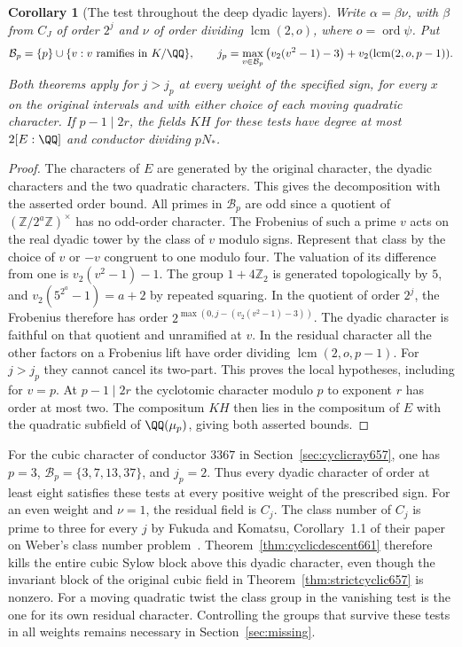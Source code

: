 \documentclass[a4paper,11pt]{article}
\newtheorem{corollary}[proposition]{Corollary}
\theoremstyle{definition}
\theoremstyle{remark}
\newcommand{\ZZ}{\mathbb Z}\newcommand{\ord}{\operatorname{ord}}
\numberwithin{equation}{section}
\begin{document}
\begin{corollary}[The test throughout the deep dyadic layers]
\leavevmode\label{cor:dyadiccyclic661}
Write \(\alpha=\beta\nu\), with \(\beta\) from \(C_J\) of order
\(2^j\) and \(\nu\) of order dividing \(\operatorname{lcm}(2,o)\),
where \(o=\operatorname{ord}\psi\). Put
\[
 \mathcal B_p=\{p\}\cup\{v:v\text{ ramifies in }K/\QQ\},
 \qquad
 j_p=\max_{v\in\mathcal B_p}\big(v_2(v^2-1)-3\big)
                          +v_2(\operatorname{lcm}(2,o,p-1)).
\]
Both theorems apply for \(j>j_p\) at every weight of the
specified sign, for every \(x\) on the original intervals and
with either choice of each moving quadratic character.
If \(p-1\mid 2r\), the fields \(KH\) for these tests have degree
at most \(2[E:\QQ]\) and conductor dividing \(pN_*\).
\end{corollary}
\begin{proof}
The characters of \(E\) are generated by the original character,
the dyadic characters and the two quadratic characters. This
gives the decomposition with the asserted order bound. All
primes in \(\mathcal B_p\) are odd since a quotient of
\((\ZZ/2^a\ZZ)^\times\) has no odd-order character.
The Frobenius of such a prime \(v\) acts on the real dyadic
tower by the class of \(v\) modulo signs. Represent that class
by the choice of \(v\) or \(-v\) congruent to one modulo four.
The valuation of its difference from one is \(v_2(v^2-1)-1\).
The group \(1+4\ZZ_2\) is generated topologically by \(5\),
and \(v_2(5^{2^a}-1)=a+2\) by repeated squaring. In the
quotient of order \(2^j\), the Frobenius therefore has order
\(2^{\max(0,j-(v_2(v^2-1)-3))}\). The dyadic character is
faithful on that quotient and unramified at \(v\). In the
residual character all the other factors on a Frobenius lift
have order dividing \(\operatorname{lcm}(2,o,p-1)\).
For \(j>j_p\) they cannot cancel its two-part. This proves the
local hypotheses, including for \(v=p\). At \(p-1\mid2r\)
the cyclotomic character modulo \(p\) to exponent \(r\) has
order at most two. The compositum \(KH\) then lies in the
compositum of \(E\) with the quadratic subfield of
\(\QQ(\mu_p)\), giving both asserted bounds.
\end{proof}

For the cubic character of conductor \(3367\) in
Section~\ref{sec:cyclicray657}, one has \(p=3\),
\(\mathcal B_p=\{3,7,13,37\}\), and \(j_p=2\). Thus every
dyadic character of order at least eight satisfies these tests
at every positive weight of the prescribed sign. For an even
weight and \(\nu=1\), the residual field is \(C_j\). The
class number of \(C_j\) is prime to three for every \(j\) by
Fukuda and Komatsu, Corollary~1.1 of their paper on Weber's
class number problem~\cite{IV-II-weberFK524}. Theorem~\ref{thm:cyclicdescent661}
therefore kills the entire cubic Sylow block above this dyadic
character, even though the invariant block of the original
cubic field in Theorem~\ref{thm:strictcyclic657} is nonzero.
For a moving quadratic twist the class group in the vanishing
test is the one for its own residual character. Controlling
the groups that survive these tests in all weights remains
necessary in Section~\ref{sec:missing}.
\end{document}
